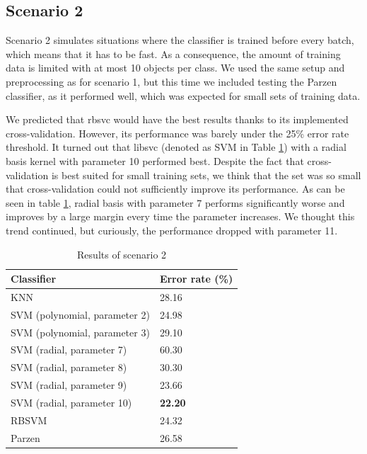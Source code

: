 \documentclass[11pt,twoside,a4paper]{article}
\begin{document}
\subsection{Scenario 2}
Scenario 2 simulates situations where the classifier is trained before every batch, which means that it has to be fast. As a consequence, the amount of training data is limited with at most 10 objects per class. We used the same setup and preprocessing as for scenario 1, but this time we included testing the Parzen classifier, as it performed well, which was expected for small sets of training data.

We predicted that rbsvc would have the best results thanks to its implemented cross-validation. However, its performance was barely under the 25\% error rate threshold. It turned out that libsvc (denoted as SVM in Table \ref{table:scenario2}) with a radial basis kernel with parameter 10 performed best. Despite the fact that cross-validation is best suited for small training sets, we think that the set was so small that cross-validation could not sufficiently improve its performance. As can be seen in table \ref{table:scenario2}, radial basis with parameter 7 performs significantly worse and improves by a large margin every time the parameter increases. We thought this trend continued, but curiously, the performance dropped with parameter 11.

\begin{table}[h]
\centering
    \begin{tabular}{ll}
    Classifier                    & Error rate (\%) \\ \hline
    KNN                           & 28.16 \\
    SVM (polynomial, parameter 2) & 24.98           \\
    SVM (polynomial, parameter 3) & 29.10           \\
    SVM (radial, parameter 7)     & 60.30           \\
    SVM (radial, parameter 8)     & 30.30           \\
    SVM (radial, parameter 9)     & 23.66           \\
    SVM (radial, parameter 10)    & \bf{22.20}           \\
    RBSVM                         & 24.32           \\
    Parzen                        & 26.58           \\
    \end{tabular}
    \caption{Results of scenario 2}
    \label{table:scenario2}
\end{table}
\end{document}

